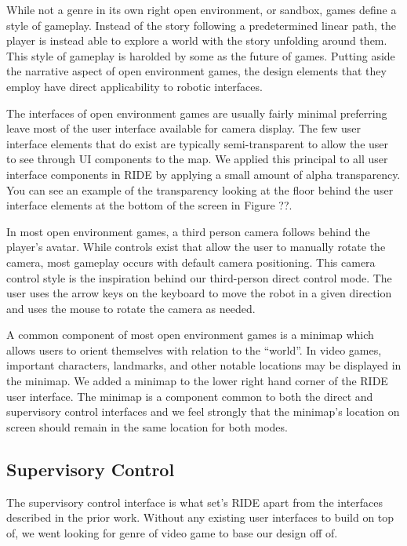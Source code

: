 While not a genre in its own right open environment, or sandbox, games define a style of gameplay. Instead of the story following a predetermined linear path, the player is instead able to explore a world with the story unfolding around them. This style of gameplay is harolded by some as the future of games. Putting aside the narrative aspect of open environment games, the design elements that they employ have direct applicability to robotic interfaces.

The interfaces of open environment games are usually fairly minimal preferring leave most of the user interface available for camera display. The few user interface elements that do exist are typically semi-transparent to allow the user to see through UI components to the map. We applied this principal to all user interface components in RIDE by applying a small amount of alpha transparency. You can see an example of the transparency looking at the floor behind the user interface elements at the bottom of the screen in Figure ??. 

In most open environment games, a third person camera follows behind the player's avatar. While controls exist that allow the user to manually rotate the camera, most gameplay occurs with default camera positioning. This camera control style is the inspiration behind our third-person direct control mode. The user uses the arrow keys on the keyboard to move the robot in a given direction and uses the mouse to rotate the camera as needed.

A common component of most open environment games is a minimap which allows users to orient themselves with relation to the ``world''. In video games, important characters, landmarks, and other notable locations may be displayed in the minimap. We added a minimap to the lower right hand corner of the RIDE user interface. The minimap is a component common to both the direct and supervisory control interfaces and we feel strongly that the minimap's location on screen should remain in the same location for both modes.

\subsection{Supervisory Control}

The supervisory control interface is what set's RIDE apart from the interfaces described in the prior work. Without any existing user interfaces to build on top of, we went looking for genre of video game to base our design off of.

